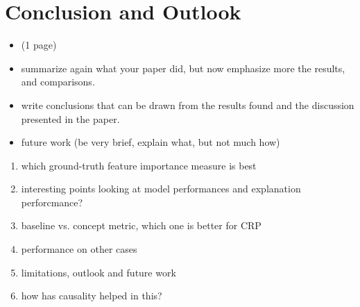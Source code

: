 \chapter{Conclusion and Outlook}\label{chapter:conclusion}      

{ \color{red} 
\begin{itemize}
    \item (1 page) 
    \item summarize again what your paper did, but now emphasize more the results, and comparisons. 
    \item write conclusions that can be drawn from the results found and the discussion presented in the paper. 
    \item future work (be very brief, explain what, but not much how)
\end{itemize}
 }

 
\begin{enumerate}
    \item which ground-truth feature importance measure is best
    \item interesting points looking at model performances and explanation perforcmance?
    \item baseline vs. concept metric, which one is better for CRP
    \item performance on other cases
    \item limitations, outlook and future work
    \item how has causality helped in this? 
\end{enumerate}